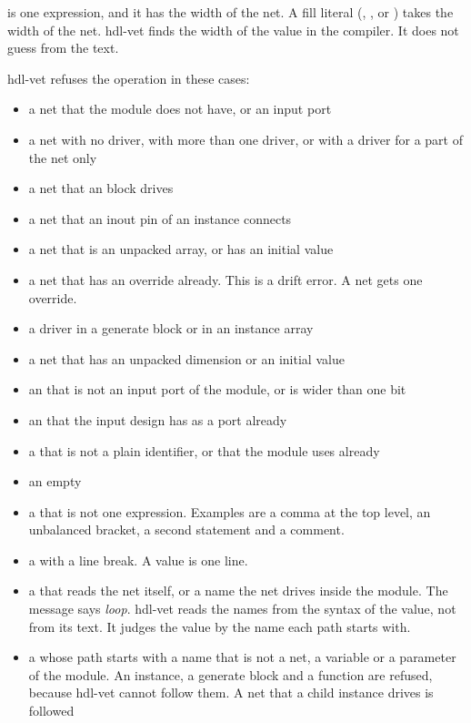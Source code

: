 \begin{entry}{}
   is one expression, and it has the width of the net. A fill literal
  (, ,  or ) takes the width of the net. hdl-vet finds
  the width of the value in the compiler. It does not guess from the text.
\item[Refused] hdl-vet refuses the operation in these cases:
  \begin{itemize}
  \item a net that the module does not have, or an input port
  \item a net with no driver, with more than one driver, or with a driver for a part of
    the net only
  \item a net that an  block drives
  \item a net that an inout pin of an instance connects
  \item a net that is an unpacked array, or has an initial value
  \item a net that has an override already. This is a drift error. A net gets one override.
  \item a driver in a generate block or in an instance array
  \item a net that has an unpacked dimension or an initial value
  \item an  that is not an input port of the module, or is wider than one bit
  \item an  that the input design has as a port already
  \item a  that is not a plain identifier, or that the module uses already
  \item an empty 
  \item a  that is not one expression. Examples are a comma at the top level, an
    unbalanced bracket, a second statement and a comment.
  \item a  with a line break. A value is one line.
  \item a  that reads the net itself, or a name the net drives inside the
    module. The message says \emph{loop}. hdl-vet reads the names from the syntax of the
    value, not from its text. It judges the value by the name each path starts with.
  \item a  whose path starts with a name that is not a net, a variable or a
    parameter of the module. An instance, a generate block and a function are refused,
    because hdl-vet cannot follow them. A net that a child instance drives is followed

\end{itemize}
\end{entry}
